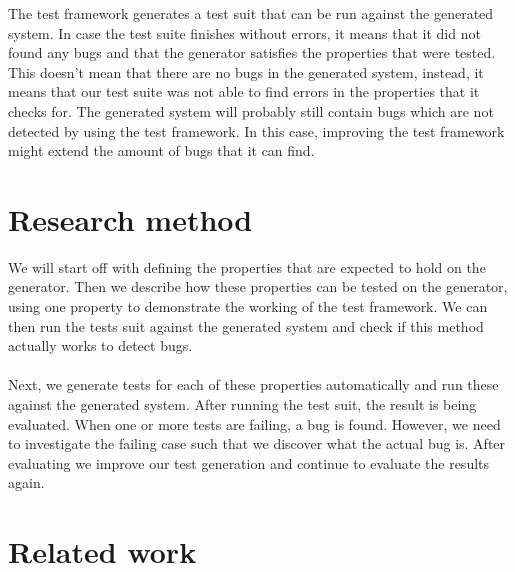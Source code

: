 The test framework generates a test suit that can be run against the generated system. In case the test suite finishes without errors, it means that it did not found any bugs and that the generator satisfies the properties that were tested. This doesn't mean that there are no bugs in the generated system, instead, it means that our test suite was not able to find errors in the properties that it checks for. The generated system will probably still contain bugs which are not detected by using the test framework. In this case, improving the test framework might extend the amount of bugs that it can find.

\section{Research method}
We will start off with defining the properties that are expected to hold on the generator. Then we describe how these properties can be tested on the generator, using one property to demonstrate the working of the test framework. We can then run the tests suit against the generated system and check if this method actually works to detect bugs.\\
\\
Next, we generate tests for each of these properties automatically and run these against the generated system. After running the test suit, the result is being evaluated. When one or more tests are failing, a bug is found. However, we need to investigate the failing case such that we discover what the actual bug is. After evaluating we improve our test generation and continue to evaluate the results again.

\section{Related work}
